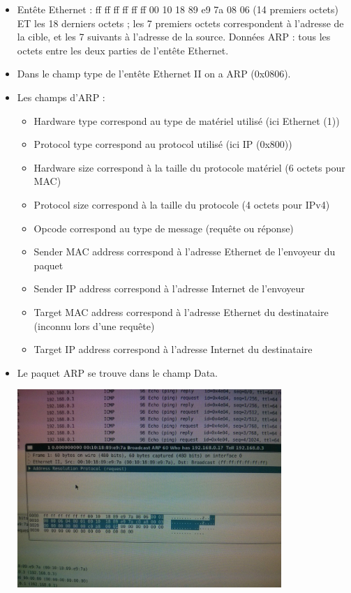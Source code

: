 \documentclass{article}
\begin{document}
\begin{itemize}\renewcommand{\labelitemi}{$\bullet$}

	\item Entête Ethernet : ff ff ff ff ff ff 00 10 18 89 e9 7a 08 06 (14 premiers octets) ET les 18 derniers octets ; les 7 premiers octets correspondent à l'adresse de la cible, et les 7 suivants à l'adresse de la source.
Données ARP : tous les octets entre les deux parties de l'entête Ethernet.
	\item Dans le champ type de l'entête Ethernet II on a ARP (0x0806).

	\item Les champs d'ARP :
	\begin{itemize}\renewcommand{\labelitemi}{$\bullet$}
		\item Hardware type correspond au type de matériel utilisé (ici Ethernet (1))
		\item Protocol type correspond au protocol utilisé (ici IP (0x800))
		\item Hardware size correspond à la taille du protocole matériel (6 octets pour MAC)
		\item Protocol size correspond à la taille du protocole (4 octets pour IPv4)
		\item Opcode correspond au type de message (requête ou réponse)
		\item Sender MAC address correspond à l'adresse Ethernet de l'envoyeur du paquet
		\item Sender IP address correspond à l'adresse Internet de l'envoyeur
		\item Target MAC address correspond à l'adresse Ethernet du destinataire (inconnu lors d'une requête)
		\item Target IP address correspond à l'adresse Internet du destinataire
	\end{itemize}
	\item Le paquet ARP se trouve dans le champ Data.

\includegraphics[width=10cm]{screen2.jpg}


\end{itemize}
\end{document}
